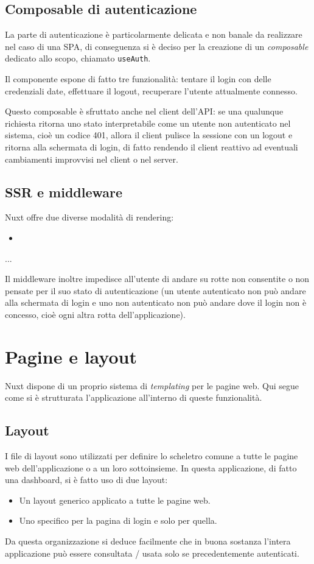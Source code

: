 \subsection{Composable di autenticazione}
La parte di autenticazione è particolarmente delicata e non banale da realizzare nel caso di una SPA, di conseguenza si è deciso per la creazione di un \emph{composable} dedicato allo scopo, chiamato \texttt{useAuth}.

Il componente espone di fatto tre funzionalità: tentare il login con delle credenziali date, effettuare il logout, recuperare l'utente attualmente connesso.

Questo composable è sfruttato anche nel client dell'API: se una qualunque richiesta ritorna uno stato interpretabile come un utente non autenticato nel sistema, cioè un codice 401, allora il client pulisce la sessione con un logout e ritorna alla schermata di login, di fatto rendendo il client reattivo ad eventuali cambiamenti improvvisi nel client o nel server.

\subsection{SSR e middleware}
Nuxt offre due diverse modalità di rendering:
\begin{itemize}
    \item 
\end{itemize}

...

Il middleware inoltre impedisce all'utente di andare su rotte non consentite o non pensate per il suo stato di autenticazione (un utente autenticato non può andare alla schermata di login e uno non autenticato non può andare dove il login non è concesso, cioè ogni altra rotta dell'applicazione).

\section{Pagine e layout}
Nuxt dispone di un proprio sistema di \emph{templating} per le pagine web. Qui segue come si è strutturata l'applicazione all'interno di queste funzionalità.

\subsection{Layout}
I file di layout sono utilizzati per definire lo scheletro comune a tutte le pagine web dell'applicazione o a un loro sottoinsieme. In questa applicazione, di fatto una dashboard, si è fatto uso di due layout:
\begin{itemize}
    \item Un layout generico applicato a tutte le pagine web.
    \item Uno specifico per la pagina di login e solo per quella.
\end{itemize}
Da questa organizzazione si deduce facilmente che in buona sostanza l'intera applicazione può essere consultata / usata solo se precedentemente autenticati.

